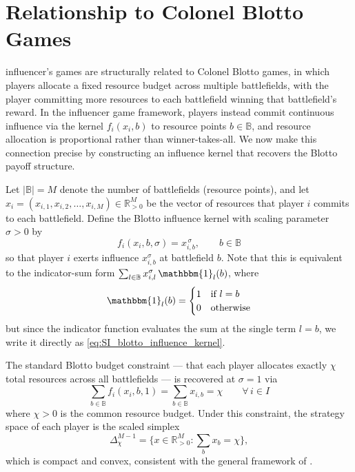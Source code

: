 \documentclass{article}
\begin{document}
    \section{Relationship to Colonel Blotto Games}\label{sec:SI_blotto}
        
        influencer's games are structurally related to Colonel Blotto games, in which players allocate a fixed resource budget across multiple battlefields, with the player committing more resources to each battlefield winning that battlefield's reward. In the influencer game framework, players instead commit continuous influence via the kernel $f_i(x_i,b)$ to resource points $b \in \mathbb{B}$, and resource allocation is proportional rather than winner-takes-all.
        We now make this connection precise by constructing an influence kernel that recovers the Blotto payoff structure.

        Let $|\mathbb{B}| = M$ denote the number of battlefields (resource points), and let $x_i = (x_{i,1}, x_{i,2}, \ldots, x_{i,M}) \in \mathbb{R}_{>0}^M$ be the vector of resources that player $i$ commits to each battlefield.
        Define the Blotto influence kernel with scaling parameter $\sigma > 0$ by
        \begin{equation}
            \label{eq:SI_blotto_influence_kernel}
            f_i(x_i, b, \sigma) = x_{i,b}^{\,\sigma}, \qquad b \in \mathbb{B}
        \end{equation}
        so that player $i$ exerts influence $x_{i,b}^\sigma$ at battlefield $b$.
        Note that this is equivalent to the indicator-sum form $\sum_{l \in \mathbb{B}} x_{i,l}^\sigma \,\mathbbm{1}_l(b)$, where
        \begin{equation}
            \mathbbm{1}_l(b)
            = \begin{cases}
                1 & \text{if } l = b \\
                0 & \text{otherwise}
            \end{cases}
        \end{equation}
        but since the indicator function evaluates the sum at the single term $l = b$, we write it directly as \cref{eq:SI_blotto_influence_kernel}.

        The standard Blotto budget constraint --- that each player allocates exactly $\chi$ total resources across all battlefields --- is recovered at $\sigma = 1$ via
        \begin{equation}
            \sum_{b \in \mathbb{B}} f_i(x_i, b, 1)
            = \sum_{b \in \mathbb{B}} x_{i,b}
            = \chi \qquad \forall\, i \in I
        \end{equation}
        where $\chi > 0$ is the common resource budget.
        Under this constraint, the strategy space of each player is the scaled simplex
        \[
            \Delta_\chi^{M-1}
            = \{x \in \mathbb{R}_{>0}^M : \sum_{b} x_b = \chi\},
        \]
        which is compact and convex, consistent with the general framework of .
\end{document}
